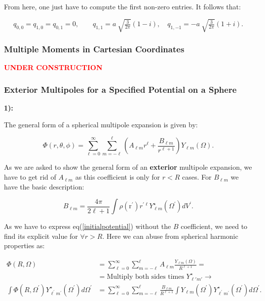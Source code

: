 From here, one just have to compute the first non-zero entries. It follows that:

\begin{equation}
	q_{0,0} = q_{1,0} = q_{0,1} = 0, \quad \quad q_{1,1} = a \: \sqrt{\tfrac{3}{2\pi}}(1-i), \quad q_{1,-1} = -a \: \sqrt{\tfrac{3}{2\pi}}(1+i).
\end{equation}

\subsubsection{Multiple Moments in Cartesian Coordinates}\label{Multiple Moments in Cartesian Coordinates}
\textbf{\textcolor{red}{UNDER CONSTRUCTION}}


\subsubsection{Exterior Multipoles for a Specified Potential on a Sphere}\label{Exterior Multipoles for a Specified Potential on a Sphere}


\textbf{1):}

The general form of a spherical multipole expansion is given by:

\begin{equation}\label{initialpotential}
	\Phi(r,\theta, \phi)=\sum_{\ell=0}^{\infty} \sum_{m=-\ell}^{\ell}\left( A_{\ell m} r^{\ell}  + \frac{B_{\ell m}}{r^{\ell+1}} \right) Y_{\ell m}(\Omega).
\end{equation}

As we are asked to show the general form of an \textbf{exterior} multipole expansion, we have to get rid of $A_{\ell m}$ as this coefficient is only for $r< R$ cases. For $B_{\ell m}$ we have the basic description:

\begin{equation}
	B_{\ell m}=\frac{4 \pi}{2 \ell+1} \int \rho\left(\mathrm{r}^{\prime}\right) r^{\prime \ell} Y_{\ell m}^{\star}\left(\Omega^{\prime}\right) d V^{\prime}.
\end{equation}

As we have to express eq(\ref{initialpotential}) without the $B$ coefficient, we need to find its explicit value for $\forall r> R$. Here we can abuse from spherical harmonic properties as:
	
\begin{equation}
	\begin{split}
		\Phi(R, \Omega)&=\sum_{\ell=0}^{\infty} \sum_{m=-\ell}^{\ell} A_{\ell m} \frac{Y_{\ell m}(\Omega)}{R^{\ell+1}}= \\
		&= 	\text{Multiply both sides times $Y^{\star}_{\ell' m'}$}\rightarrow \\
		\int \Phi\left(R, \Omega^{\prime}\right) Y_{\ell^{\prime} m^{\prime}}^{\star}\left(\Omega^{\prime}\right) d \Omega^{\prime}&=\sum_{\ell=0}^{\infty} \sum_{m=-\ell}^{\ell} \frac{B_{\ell m}}{R^{\ell+1}} \int Y_{\ell m}\left(\Omega^{\prime}\right) Y_{\ell^{\prime} m^{\prime}}^{\star}\left(\Omega^{\prime}\right) d \Omega^{\prime} .
	\end{split}
\end{equation}

